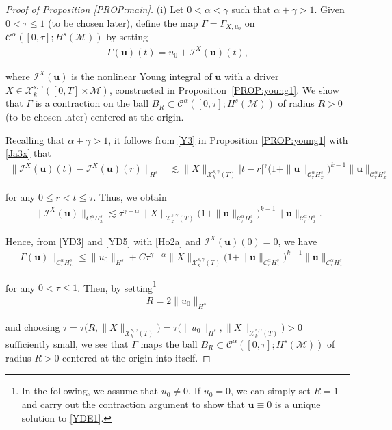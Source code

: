 \documentclass[letterpaper, 11pt,  reqno]{amsart}
\newcommand{\1}{\hspace{0.5mm}\text{I}\hspace{0.5mm}}
\newcommand{\I}{\mathcal{I}}
\newcommand{\noi}{\noindent}
\newcommand{\CC}{\mathcal{C}}
\newcommand{\al}{\alpha}
\newcommand{\g}{\gamma}
\newcommand{\G}{\Gamma}
\newcommand{\les}{\lesssim}
\newcommand{\M}{\mathcal{M}}
\newcommand{\cC}{\mathcal{C}}
\newcommand{\cX}{\mathcal{X}}
\newcommand{\uu}{\mathbf{u}}
\numberwithin{equation}{section}
\numberwithin{theorem}{section}
\begin{document}
\begin{proof}[Proof of Proposition \ref{PROP:main}]
(i) 
Let $0 < \al < \g$ such that 
 $\al + \g>1$. 
Given $0 < \tau \le 1$ (to be chosen later), 
 define 
 the map
$\G = \G_{X, u_0}$ on $\cC^\al([0, \tau]; H^s(\M))$
by setting
\begin{align}
\G(\uu)(t) = u_0 + \I^X(\uu)(t), 
\label{YD3}
\end{align}

\noi

\noi
where $\I^X(\uu)$ is the nonlinear Young integral of 
$\uu$ with a driver 
$X \in \cX^{s, \g}_k([0, T]\times \M)$, 
constructed in Proposition~\ref{PROP:young1}.
We show that $\G$ is a contraction on 
the ball $B_R\subset 
\cC^\al([0, \tau]; H^s(\M))$
of radius $R > 0$ 
(to be chosen later)
centered at the origin.

Recalling that $\al + \g > 1$, 
it follows 
from  \eqref{Y3} in 
Proposition \ref{PROP:young1}
with \eqref{Ja3x} that 
\begin{align*}
\|\I^X(\uu)(t) - \I^X(\uu)(r)\|_{H^s}
& \les 
\|X\|_{\cX^{s, \g}_k(T)}
|t-r|^{\g}
\big(1+ 
\|\uu\|_{\CC^\al_{\tau } H^s_x}\big)^{k-1}
\|\uu\|_{\CC^\al_{\tau } H^s_x}
\end{align*}


\noi
for any $0 \le r < t \le \tau$.
Thus, we obtain 
\begin{align}
\label{YD5}
\|\I^X(\uu)\|_{C^\al_\tau H^s_x}
\les \tau^{\g - \al}
\|X\|_{\cX^{s, \g}_k(T)}
\big(1+ 
\|\uu\|_{\CC^\al_{\tau } H^s_x}\big)^{k-1}
\|\uu\|_{\CC^\al_{\tau } H^s_x}.
\end{align}



\noi
Hence, from \eqref{YD3}
and \eqref{YD5} with 
\eqref{Ho2a} and 
$\I^X(\uu)(0) = 0$, 
we have 
\begin{align}
\label{YD5a}
\|\G(\uu)\|_{\CC^\al_\tau H^s_x}
\le \|u_0\|_{H^s} +  C\tau^{\g - \al}
\|X\|_{\cX^{s, \g}_k(T)}
\big(1+ 
\|\uu\|_{\CC^\al_{\tau } H^s_x}\big)^{k-1}
\|\uu\|_{\CC^\al_{\tau } H^s_x}
\end{align}

\noi
for any $0 < \tau \le 1$.
Then, by setting\footnote{In the following, we assume that $u_0 \ne 0$.
If $u_0 = 0$, we can simply set $R = 1$ and carry out the contraction argument
to show that  $\uu \equiv 0$ is a unique solution to \eqref{YDE1}.} 
\begin{align}
R = 2 \|u_0\|_{H^s} 
\label{YD5b}
\end{align}

\noi
and choosing 
$\tau = 
\tau\big(R, \|X\|_{\cX^{s, \g}_k(T)}\big) 
= 
\tau\big(\|u_0\|_{H^s}, \|X\|_{\cX^{s, \g}_k(T)}\big) >0$
sufficiently small, 
we see that 
$\G$ maps the ball $B_R\subset 
\cC^\al([0, \tau]; H^s(\M))$
of radius $R > 0$ 
centered at the origin into itself.






\end{proof}
\end{document}
